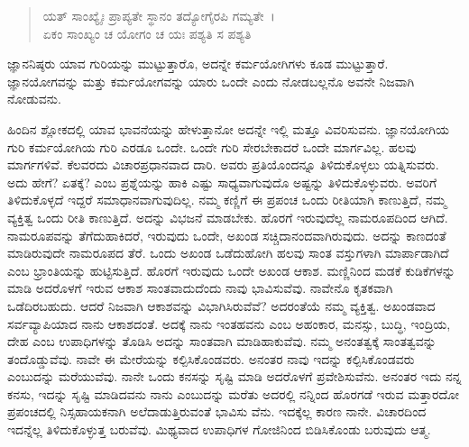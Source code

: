 \begin{verse}
ಯತ್ ಸಾಂಖ್ಯೈಃ ಪ್ರಾಪ್ಯತೇ ಸ್ಥಾನಂ ತದ್ಯೋಗೈರಪಿ ಗಮ್ಯತೇ~।\\ಏಕಂ ಸಾಂಖ್ಯಂ ಚ ಯೋಗಂ ಚ ಯಃ ಪಶ್ಯತಿ ಸ ಪಶ್ಯತಿ 
\end{verse}

{\small ಜ್ಞಾನನಿಷ್ಠರು ಯಾವ ಗುರಿಯನ್ನು ಮುಟ್ಟುತ್ತಾರೊ, ಅದನ್ನೇ ಕರ್ಮಯೋಗಿಗಳು ಕೂಡ ಮುಟ್ಟುತ್ತಾರೆ. ಜ್ಞಾನಯೋಗವನ್ನು ಮತ್ತು ಕರ್ಮಯೋಗವನ್ನು ಯಾರು ಒಂದೇ ಎಂದು ನೋಡಬಲ್ಲನೊ ಅವನೇ ನಿಜವಾಗಿ ನೋಡುವನು.}

ಹಿಂದಿನ ಶ್ಲೋಕದಲ್ಲಿ ಯಾವ ಭಾವನೆಯನ್ನು ಹೇಳುತ್ತಾನೋ ಅದನ್ನೇ ಇಲ್ಲಿ ಮತ್ತೂ ವಿವರಿಸುವನು. ಜ್ಞಾನಯೋಗಿಯ ಗುರಿ ಕರ್ಮಯೋಗಿಯ ಗುರಿ ಎರಡೂ ಒಂದೇ. ಒಂದೇ ಗುರಿ ಸೇರಬೇಕಾದರೆ ಒಂದೇ ಮಾರ್ಗವಿಲ್ಲ. ಹಲವು ಮಾರ್ಗಗಳಿವೆ. ಕೆಲವರದು ವಿಚಾರಪ್ರಧಾನವಾದ ದಾರಿ. ಅವರು ಪ್ರತಿಯೊಂದನ್ನೂ ತಿಳಿದುಕೊಳ್ಳಲು ಯತ್ನಿಸುವರು. ಅದು ಹೇಗೆ? ಏತಕ್ಕೆ? ಎಂಬ ಪ್ರಶ್ನೆಯನ್ನು ಹಾಕಿ ಎಷ್ಟು ಸಾಧ್ಯವಾಗುವುದೊ ಅಷ್ಟನ್ನು ತಿಳಿದುಕೊಳ್ಳುವರು. ಅವರಿಗೆ ತಿಳಿದುಕೊಳ್ಳದೆ ಇದ್ದರೆ ಸಮಾಧಾನವಾಗುವುದಿಲ್ಲ. ನಮ್ಮ ಕಣ್ಣಿಗೆ ಈ ಪ್ರಪಂಚ ಒಂದು ರೀತಿಯಾಗಿ ಕಾಣುತ್ತಿದೆ, ನಮ್ಮ ವ್ಯಕ್ತಿತ್ವ ಒಂದು ರೀತಿ ಕಾಣುತ್ತಿದೆ. ಅದನ್ನು ವಿಭಜನೆ ಮಾಡಬೇಕು. ಹೊರಗೆ ಇರುವುದೆಲ್ಲ ನಾಮರೂಪದಿಂದ ಆಗಿದೆ. ನಾಮರೂಪವನ್ನು ತೆಗೆದುಹಾಕಿದರೆ, ಇರುವುದು ಒಂದೇ, ಅಖಂಡ ಸಚ್ಚಿದಾನಂದವಾಗಿರುವುದು. ಅದನ್ನು ಕಾಣದಂತೆ ಮಾಡಿರುವುದೇ ನಾಮರೂಪದ ತೆರೆ. ಒಂದು ಅಖಂಡ ಒಡೆದುಹೋಗಿ ಹಲವು ಸಾಂತ ವಸ್ತುಗಳಾಗಿ ಮಾರ್ಪಾಡಾಗಿದೆ ಎಂಬ ಭ್ರಾಂತಿಯನ್ನು ಹುಟ್ಟಿಸುತ್ತಿದೆ. ಹೊರಗೆ ಇರುವುದು ಒಂದೇ ಅಖಂಡ ಆಕಾಶ. ಮಣ್ಣಿನಿಂದ ಮಡಕೆ ಕುಡಿಕೆಗಳನ್ನು ಮಾಡಿ ಅದರೊಳಗೆ ಇರುವ ಆಕಾಶ ಸಾಂತವಾದುದೆಂದು ನಾವು ಭಾವಿಸುವೆವು. ನಾವೇನೊ ಕೃತಕವಾಗಿ ಒಡೆದಿರಬಹುದು. ಆದರೆ ನಿಜವಾಗಿ ಆಕಾಶವನ್ನು ವಿಭಾಗಿಸಿರುವೆವೆ? ಅದರಂತೆಯೆ ನಮ್ಮ ವ್ಯಕ್ತಿತ್ವ. ಅಖಂಡವಾದ ಸರ್ವವ್ಯಾಪಿಯಾದ ನಾನು ಆಕಾಶದಂತೆ. ಅದಕ್ಕೆ ನಾನು ಇಂತಹವನು ಎಂಬ ಅಹಂಕಾರ, ಮನಸ್ಸು, ಬುದ್ಧಿ, ಇಂದ್ರಿಯ, ದೇಹ ಎಂಬ ಉಪಾಧಿಗಳನ್ನು ತೊಡಿಸಿ ಅದನ್ನು ಸಾಂತವಾಗಿ ಮಾಡಿಹಾಕುವೆವು. ನಮ್ಮ ಅನಂತತ್ವಕ್ಕೆ ಸಾಂತತ್ವವನ್ನು ತಂದೊಡ್ಡುವೆವು. ನಾವೇ ಈ ಮೇರೆಯನ್ನು ಕಲ್ಪಿಸಿಕೊಂಡವರು. ಅನಂತರ ನಾವು ಇದನ್ನು ಕಲ್ಪಿಸಿಕೊಂಡವರು ಎಂಬುದನ್ನು ಮರೆಯುವೆವು. ನಾನೇ ಒಂದು ಕನಸನ್ನು ಸೃಷ್ಟಿ ಮಾಡಿ ಅದರೊಳಗೆ ಪ್ರವೇಶಿಸುವೆನು. ಅನಂತರ ಇದು ನನ್ನ ಕನಸು, ಇದನ್ನು ಸೃಷ್ಟಿ ಮಾಡಿದವನು ನಾನು ಎಂಬುದನ್ನು ಮರೆತು ಅದರಲ್ಲಿ ನನ್ನಿಂದ ಹೊರಗಡೆ ಇರುವ ಮತ್ತಾರದೋ ಪ್ರಪಂಚದಲ್ಲಿ ನಿಸ್ಸಹಾಯಕನಾಗಿ ಅಲೆದಾಡುತ್ತಿರುವಂತೆ ಭಾವಿಸು ವೆನು. ಇದಕ್ಕೆಲ್ಲ ಕಾರಣ ನಾನೇ. ವಿಚಾರದಿಂದ ಇದನ್ನೆಲ್ಲ ತಿಳಿದುಕೊಳ್ಳುತ್ತ ಬರುವೆವು. ಮಿಥ್ಯವಾದ ಉಪಾಧಿಗಳ ಗೋಜಿನಿಂದ ಬಿಡಿಸಿಕೊಂಡು ಬರುವುದು ಆತ್ಮ.

